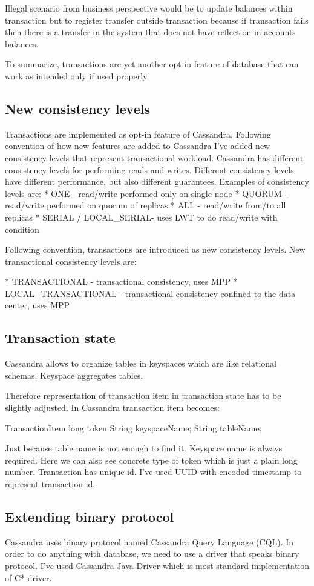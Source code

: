 Illegal scenario from business perspective would be to update balances within transaction but to register transfer outside transaction because if transaction fails then there is a transfer in the system that does not have reflection in accounts balances. 


To summarize, transactions are yet another opt-in feature of database that can work as intended only if used properly. 


\subsection{New consistency levels}
Transactions are implemented as opt-in feature of Cassandra. Following convention of how new features are added to Cassandra I’ve added new consistency levels that represent transactional workload.
Cassandra has different consistency levels for performing reads and writes. Different consistency levels have different performance, but also different guarantees. Examples of consistency levels are:
* ONE - read/write performed only on single node
* QUORUM - read/write performed on quorum of replicas
* ALL - read/write from/to all replicas
* SERIAL / LOCAL_SERIAL- uses LWT to do read/write with condition


Following convention, transactions are introduced as new consistency levels. New transactional consistency levels are:


* TRANSACTIONAL - transactional consistency, uses MPP
* LOCAL_TRANSACTIONAL - transactional consistency confined to the data center, uses MPP


\subsection{Transaction state}
Cassandra allows to organize tables in keyspaces which are like relational schemas. Keyspace aggregates tables. 


Therefore representation of transaction item in transaction state has to be slightly adjusted. In Cassandra transaction item becomes:


TransactionItem {
   long token
   String keyspaceName;
   String tableName;
}


Just because table name is not enough to find it. Keyspace name is always required. Here we can also see concrete type of token which is just a plain long number.
Transaction has unique id. I’ve used UUID with encoded timestamp to represent transaction id.


\subsection{Extending binary protocol}
Cassandra uses binary protocol named Cassandra Query Language (CQL). In order to do anything with database, we need to use a driver that speaks binary protocol. I’ve used Cassandra Java Driver which is most standard implementation of C* driver.



